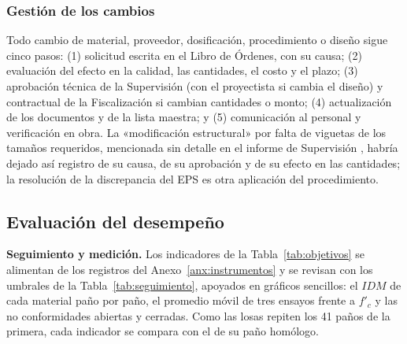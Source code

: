 \subsubsection{Gestión de los cambios} Todo cambio de material, proveedor, dosificación, procedimiento o diseño sigue cinco pasos: (1) solicitud escrita en el Libro de Órdenes, con su causa; (2) evaluación del efecto en la calidad, las cantidades, el costo y el plazo; (3) aprobación técnica de la Supervisión (con el proyectista si cambia el diseño) y contractual de la Fiscalización si cambian cantidades o monto; (4) actualización de los documentos y de la lista maestra; y (5) comunicación al personal y verificación en obra. La «modificación estructural» por falta de viguetas de los tamaños requeridos, mencionada sin detalle en el informe de Supervisión \parencite[p.~11]{uatf2025pao2}, habría dejado así registro de su causa, de su aprobación y de su efecto en las cantidades; la resolución de la discrepancia del EPS es otra aplicación del procedimiento.

\subsection{Evaluación del desempeño}
\label{sec:sgc-evaluacion}

\textbf{Seguimiento y medición.} Los indicadores de la Tabla~\ref{tab:objetivos} se alimentan de los registros del Anexo~\ref{anx:instrumentos} y se revisan con los umbrales de la Tabla~\ref{tab:seguimiento}, apoyados en gráficos sencillos: el $IDM$ de cada material paño por paño, el promedio móvil de tres ensayos frente a $f'_c$ y las no conformidades abiertas y cerradas. Como las losas repiten los 41 paños de la primera, cada indicador se compara con el de su paño homólogo.

